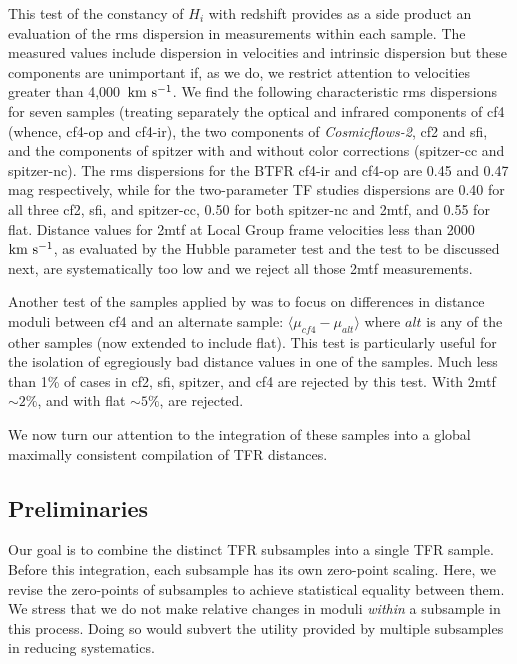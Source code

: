 \documentclass[twocolumn]{aastex63}
\newcommand{\kms}{\mbox{${\rm km~s^{-1}}$}}
\begin{document}
This test of the constancy of $H_i$ with redshift provides as a side product an evaluation of the rms dispersion in measurements within each sample. The measured values include dispersion in velocities and intrinsic dispersion but these components are unimportant if, as we do, we restrict attention to velocities greater than 4,000~\kms.  We find the following characteristic rms dispersions for seven samples (treating separately the optical and infrared components of cf4 (whence, cf4-op and cf4-ir), the two components of {\it Cosmicflows-2}, cf2 and sfi, and the components of spitzer with and without color corrections (spitzer-cc and spitzer-nc).  The rms dispersions for the BTFR cf4-ir and cf4-op are 0.45 and 0.47 mag respectively, while for the two-parameter TF studies dispersions are 0.40 for all three cf2, sfi, and spitzer-cc, 0.50 for both spitzer-nc and 2mtf, and 0.55 for flat.  Distance values for 2mtf at Local Group frame velocities less than 2000~\kms, as evaluated by the Hubble parameter test and the test to be discussed next, are systematically too low and we reject all those 2mtf measurements.

Another test of the samples applied by \citet{2020ApJ...902..145K} was to focus on differences in distance moduli between cf4 and an alternate sample: $\langle \mu_{cf4} - \mu_{alt} \rangle$ where $alt$ is any of the other samples (now extended to include flat).  This test is particularly useful for the isolation of egregiously bad distance values in one of the samples.  Much less than 1\% of cases in cf2, sfi, spitzer, and cf4 are rejected by this test. With 2mtf $\sim 2\%$, and with flat $\sim 5\%$, are rejected.

We now turn our attention to the integration of these samples into a global maximally consistent compilation of TFR distances.



\subsection{Preliminaries}
\label{sec:prelim}

Our goal is to combine the distinct TFR subsamples into a single TFR sample.  Before this integration, each subsample has its own zero-point scaling.  Here, we revise the zero-points of subsamples to achieve statistical equality between them. We stress that we do not make relative changes in moduli {\it within} a subsample in this process. Doing so would subvert the utility provided by multiple subsamples in reducing systematics. 
\end{document}
